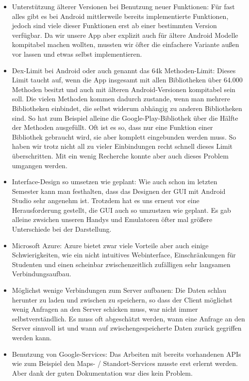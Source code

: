 \begin{itemize} 
\item Unterstützung älterer Versionen bei Benutzung neuer Funktionen: Für fast alles gibt es bei Android mittlerweile bereits implementierte Funktionen, jedoch sind viele dieser Funktionen erst ab einer bestimmten Version verfügbar. Da wir unsere App aber explizit auch für ältere Android Modelle kompitabel machen wollten, mussten wir öfter die einfachere Variante außen vor lassen und etwas selbst implementieren.
\item Dex-Limit bei Android oder auch genannt das 64k Methoden-Limit: Dieses Limit taucht auf, wenn die App insgesamt mit allen Bibliotheken über 64.000 Methoden besitzt und auch mit älteren Android-Versionen kompitabel sein soll. Die vielen Methoden kommen dadurch zustande, wenn man mehrere Bibliotheken einbindet, die selbst widerum abhängig zu anderen Bibliotheken sind. So hat zum Beispiel alleine die Google-Play-Bibliothek über die Hälfte der Methoden ausgefüllt. Oft ist es so, dass nur eine Funktion einer Bibliothek gebraucht wird, sie aber komplett eingebunden werden muss. So haben wir trotz nicht all zu vieler Einbindungen recht schnell dieses Limit überschritten. Mit ein wenig Recherche konnte aber auch dieses Problem umgangen werden.
\item  Interface-Design so umsetzen wie geplant: Wie auch schon im letzten Semester kann man festhalten, dass das Designen der GUI mit Android Studio sehr angenehm ist. Trotzdem hat es uns erneut vor eine Herausforderung gestellt, die GUI auch so umzustzen wie geplant. Es gab alleine zwsichen unseren Handys und Emulatoren öfter mal größere Unterschiede bei der Darstellung.
\item Microsoft Azure: Azure bietet zwar viele Vorteile aber auch einige Schwierigkeiten, wie ein nicht intuitives Webinterface, Einschränkungen für Studenten und einen scheinbar zwischenzeitlich zufälligen sehr langsamen Verbindungsaufbau.
\item Möglichst wenige Verbindungen zum Server aufbauen: Die Daten schlau herunter zu laden und zwischen zu speichern, so dass der Client möglichst wenig Anfragen an den Server schicken muss, war nicht immer selbstverständlich. Es muss oft abgeschätzt werden, wann eine Anfrage an den Server sinnvoll ist und wann auf zwischengespeicherte Daten zurück gegriffen werden kann.
\item Benutzung von Google-Services: Das Arbeiten mit bereits vorhandenen APIs wie zum Beispiel den Maps- / Standort-Services musste erst erlernt werden. Aber dank der guten Dokumentation war dies kein Problem.
\end{itemize}